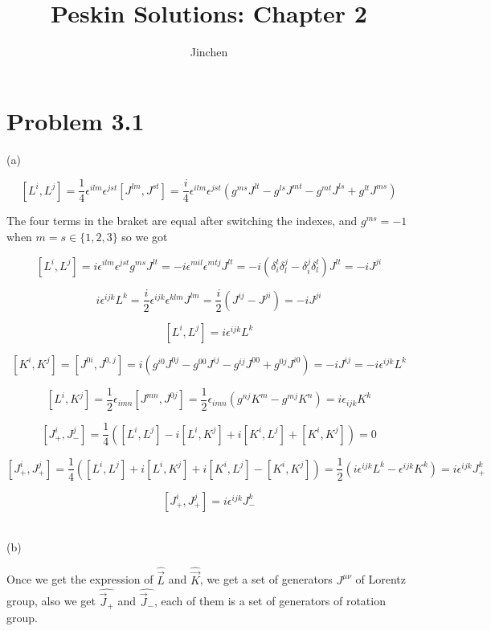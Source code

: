 \documentclass[11pt]{article} %
\title{Peskin Solutions: Chapter 2}
\author{Jinchen}
\begin{document}
\maketitle

\section{Problem 3.1}

\noindent (a)

\[
    [L^i, L^j] = \frac{1}{4} \epsilon^{i l m} \epsilon^{j s t} [J^{l m}, J^{s t}] = \frac{i}{4} \epsilon^{i l m} \epsilon^{j s t} (g^{m s} J^{l t} - g^{l s} J^{m t} - g^{m t} J^{l s} + g^{l t} J^{m s})
\]

The four terms in the braket are equal after switching the indexes, and $g^{ms} = -1$ when $m = s \in \{1, 2, 3\}$ so we got

\[
    [L^i, L^j] = i \epsilon^{i l m} \epsilon^{j s t} g^{m s} J^{l t} = -i \epsilon^{m i l} \epsilon^{m t j} J^{l t} = -i (\delta_{i}^{t} \delta_{l}^{j} - \delta_{i}^{j} \delta_{l}^{t}) J^{lt} = -i J^{j i}
\]

\[
    i \epsilon^{ijk} L^k = \frac{i}{2} \epsilon^{i j k} \epsilon^{k l m} J^{lm} = \frac{i}{2} (J^{ij} - J^{ji}) = -i J^{j i}   
\]

\[
    [L^i, L^j] = i \epsilon^{ijk} L^k  
\]

\[
    [K^i, K^j] = [J^{0 i}, J^{0, j}] = i (g^{i 0} J^{0 j} - g^{0 0} J^{i j} - g^{i j} J^{0 0} + g^{0 j} J^{i 0}) = -i J^{i j} = -i \epsilon^{ijk} L^{k}   
\]

\[
    [L^i, K^j] = \frac{1}{2} \epsilon_{i m n} [J^{m n}, J^{0 j}] = \frac{1}{2} \epsilon_{i m n} (g^{n j} K^m - g^{m j} K^n) = i \epsilon_{i j k} K^{k}   
\]

\[
    [J_+^i, J_-^j] = \frac{1}{4} ([L^i, L^j] - i [L^i, K^j] + i [K^i, L^j] + [K^i, K^j]) = 0    
\]

\[
    [J_+^i, J_+^j] = \frac{1}{4} ([L^i, L^j] + i [L^i, K^j] + i [K^i, L^j] - [K^i, K^j]) = \frac{1}{2} (i \epsilon^{i j k} L^k - \epsilon^{i j k} K^k) = i \epsilon^{i j k} J_+^k    
\]

\[
    [J_+^i, J_+^j] = i \epsilon^{i j k} J_-^k    
\]

~\\
\noindent (b)

Once we get the expression of $\hat{\vec{L}}$ and $\hat{\vec{K}}$, we get a set of generators $J^{\mu \nu}$ of Lorentz group, also we get $\hat{\vec{J}_+}$ and $\hat{\vec{J}_-}$, each of them is a set of generators of rotation group.
\end{document}
